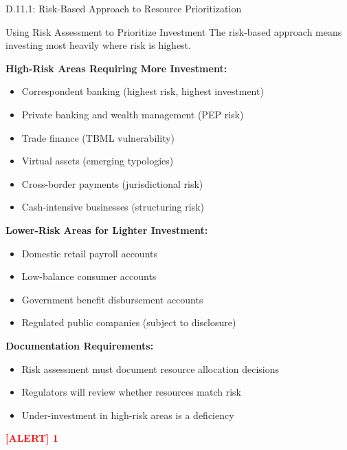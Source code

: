 \documentclass[11pt,a4paper]{beamer}
\newcommand{\redflag}[1]{\textcolor{red}{\textbf{[ALERT] 1}}}
\begin{document}
\begin{frame}{D.11.1: Risk-Based Approach to Resource Prioritization}
	\begin{block}{Using Risk Assessment to Prioritize Investment}
		The risk-based approach means investing most heavily where risk is highest.
	\end{block}
	\textbf{High-Risk Areas Requiring More Investment:}
	\begin{itemize}
		\item Correspondent banking (highest risk, highest investment)
		\item Private banking and wealth management (PEP risk)
		\item Trade finance (TBML vulnerability)
		\item Virtual assets (emerging typologies)
		\item Cross-border payments (jurisdictional risk)
		\item Cash-intensive businesses (structuring risk)
	\end{itemize}
	\textbf{Lower-Risk Areas for Lighter Investment:}
	\begin{itemize}
		\item Domestic retail payroll accounts
		\item Low-balance consumer accounts
		\item Government benefit disbursement accounts
		\item Regulated public companies (subject to disclosure)
	\end{itemize}
	\textbf{Documentation Requirements:}
	\begin{itemize}
		\item Risk assessment must document resource allocation decisions
		\item Regulators will review whether resources match risk
		\item Under-investment in high-risk areas is a deficiency
	\end{itemize}
	\redflag{Applying the same resources to all customers violates the risk-based approach.}
\end{frame}

\end{document}
